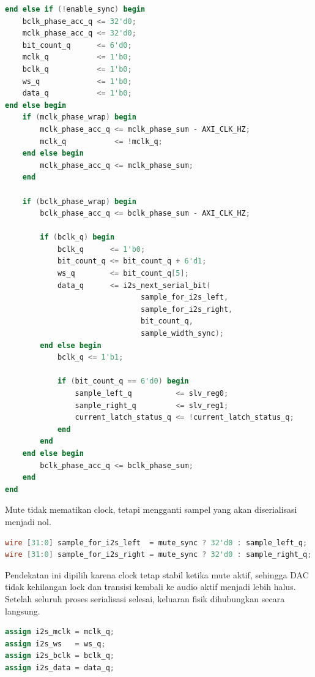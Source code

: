 \begin{lstlisting}[language=Verilog,caption={Perilaku saat \texttt{ENABLE} dimatikan.},label={lst:ch4-enable-off}]
end else if (!enable_sync) begin
    bclk_phase_acc_q <= 32'd0;
    mclk_phase_acc_q <= 32'd0;
    bit_count_q      <= 6'd0;
    mclk_q           <= 1'b0;
    bclk_q           <= 1'b0;
    ws_q             <= 1'b0;
    data_q           <= 1'b0;
end else begin
    if (mclk_phase_wrap) begin
        mclk_phase_acc_q <= mclk_phase_sum - AXI_CLK_HZ;
        mclk_q           <= !mclk_q;
    end else begin
        mclk_phase_acc_q <= mclk_phase_sum;
    end

    if (bclk_phase_wrap) begin
        bclk_phase_acc_q <= bclk_phase_sum - AXI_CLK_HZ;

        if (bclk_q) begin
            bclk_q      <= 1'b0;
            bit_count_q <= bit_count_q + 6'd1;
            ws_q        <= bit_count_q[5];
            data_q      <= i2s_next_serial_bit(
                               sample_for_i2s_left,
                               sample_for_i2s_right,
                               bit_count_q,
                               sample_width_sync);
        end else begin
            bclk_q <= 1'b1;

            if (bit_count_q == 6'd0) begin
                sample_left_q          <= slv_reg0;
                sample_right_q         <= slv_reg1;
                current_latch_status_q <= !current_latch_status_q;
            end
        end
    end else begin
        bclk_phase_acc_q <= bclk_phase_sum;
    end
end
\end{lstlisting}

Mute tidak mematikan clock, tetapi mengganti sampel yang akan diserialisasi menjadi nol.

\begin{lstlisting}[language=Verilog,caption={Logika mute pada jalur sampel serializer.},label={lst:ch4-mute}]
wire [31:0] sample_for_i2s_left  = mute_sync ? 32'd0 : sample_left_q;
wire [31:0] sample_for_i2s_right = mute_sync ? 32'd0 : sample_right_q;
\end{lstlisting}

Pendekatan ini dipilih karena clock tetap stabil ketika mute aktif, sehingga DAC tidak kehilangan lock dan transisi kembali ke audio aktif menjadi lebih halus. Setelah seluruh proses serialisasi selesai, keluaran fisik dihubungkan secara langsung.

\begin{lstlisting}[language=Verilog,caption={Pengaitan register output ke pin I2S.},label={lst:ch4-output-assign}]
assign i2s_mclk = mclk_q;
assign i2s_ws   = ws_q;
assign i2s_bclk = bclk_q;
assign i2s_data = data_q;
\end{lstlisting}

